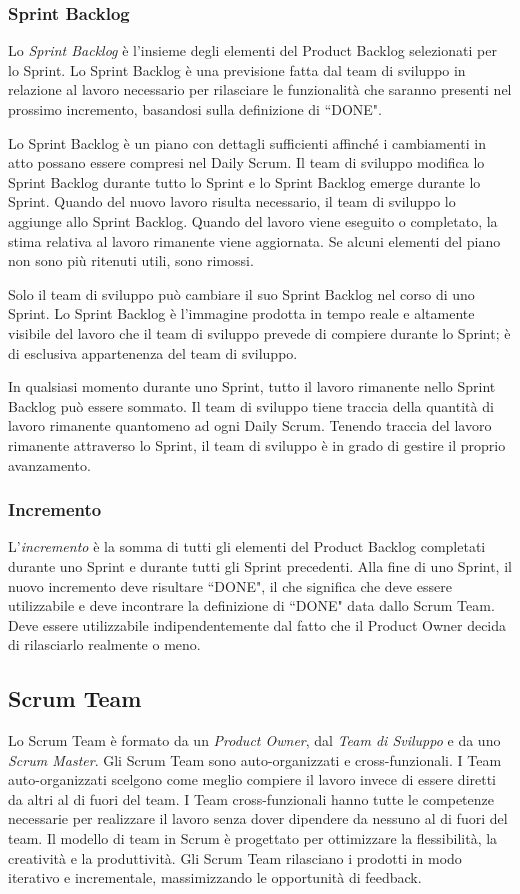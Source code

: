 \documentclass{article}
\begin{document}
\subsubsection{Sprint Backlog}
Lo \textit{Sprint Backlog} è l'insieme degli elementi del Product Backlog selezionati per lo Sprint. 
Lo Sprint Backlog è una previsione fatta dal team di sviluppo in relazione al lavoro necessario 
per rilasciare le funzionalità che saranno presenti nel prossimo incremento, basandosi sulla 
definizione di ``DONE".

Lo Sprint Backlog è un piano con dettagli sufficienti affinché i cambiamenti in atto possano 
essere compresi nel Daily Scrum. Il team di sviluppo modifica lo Sprint Backlog durante
tutto lo Sprint e lo Sprint Backlog emerge durante lo Sprint. 
Quando del nuovo lavoro risulta necessario, il team di sviluppo lo aggiunge allo Sprint Backlog. 
Quando del lavoro viene eseguito o completato, la stima relativa al lavoro rimanente viene aggiornata. 
Se alcuni elementi del piano non sono più ritenuti utili, sono rimossi. 

Solo il team di sviluppo può cambiare il suo Sprint Backlog nel corso di uno Sprint. 
Lo Sprint Backlog è l'immagine prodotta in tempo reale e altamente visibile del lavoro che il team 
di sviluppo prevede di compiere durante lo Sprint; è di esclusiva appartenenza del team di sviluppo.

In qualsiasi momento durante uno Sprint, tutto il lavoro rimanente nello Sprint Backlog può essere
sommato. Il team di sviluppo tiene traccia della quantità di lavoro rimanente quantomeno ad ogni Daily
Scrum. Tenendo traccia del lavoro rimanente attraverso lo Sprint, il team di sviluppo è in grado di
gestire il proprio avanzamento.

\subsubsection{Incremento}
L'\textit{incremento} è la somma di tutti gli elementi del Product Backlog completati durante uno Sprint e
durante tutti gli Sprint precedenti. Alla fine di uno Sprint, il nuovo incremento deve risultare ``DONE", 
il che significa che deve essere utilizzabile e deve incontrare la definizione di ``DONE" data dallo Scrum
Team. Deve essere utilizzabile indipendentemente dal fatto che il Product Owner decida di rilasciarlo
realmente o meno.

\newpage
\subsection{Scrum Team}
Lo Scrum Team è formato da un \textit{Product Owner}, dal \textit{Team di Sviluppo} e da uno \textit{Scrum Master}. 
Gli Scrum Team sono auto-organizzati e cross-funzionali. I Team auto-organizzati scelgono come meglio compiere
il lavoro invece di essere diretti da altri al di fuori del team. I Team cross-funzionali hanno tutte le
competenze necessarie per realizzare il lavoro senza dover dipendere da nessuno al di fuori del team. Il
modello di team in Scrum è progettato per ottimizzare la flessibilità, la creatività e la produttività.
Gli Scrum Team rilasciano i prodotti in modo iterativo e incrementale, massimizzando le opportunità di
feedback. 
\end{document}
